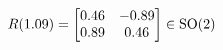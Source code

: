 \documentclass[preview]{standalone}
\begin{document}
\begin{align*}
\special{dvisvgm:raw <g id='unique000'>}R(1.09) = \begin{bmatrix} 0.46 & -0.89 \\ 0.89 & 0.46 \end{bmatrix} \in \text{SO}(2)\special{dvisvgm:raw </g>}
\end{align*}
\end{document}
